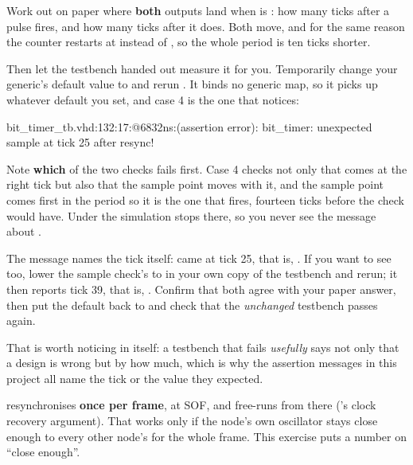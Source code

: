  Work out on paper where \textbf{both} outputs land when  is :
how many ticks after a  pulse  fires, and how many ticks after it
 does. Both move, and for the same reason \textemdash{} the counter restarts at
 instead of , so the whole period is ten ticks shorter.

Then let the testbench handed out measure it for you. Temporarily change your generic's default value
to  and rerun . It binds no generic map, so it picks up whatever default
you set, and case 4 is the one that notices:

\begin{console}
bit_timer_tb.vhd:132:17:@6832ns:(assertion error): bit_timer: unexpected sample at tick 25 after resync!
\end{console}

Note \textbf{which} of the two checks fails first. Case 4 checks not only that  comes
at the right tick but also that the sample point moves with it, and the sample point comes first in
the period \textemdash{} so it is the one that fires, fourteen ticks before the  check
would have. Under  the simulation stops there, so you never see the
message about .

The message names the tick itself:  came at tick 25, that is,
. If you want to see  too, lower the sample check's
 to  in your own copy of the testbench and rerun; it then
reports tick 39, that is, . Confirm that both agree with your
paper answer, then put the default back to  and check that the \emph{unchanged} testbench
passes again.

That is worth noticing in itself: a testbench that fails \emph{usefully} says not only that a design
is wrong but by how much, which is why the assertion messages in this project all name the tick or
the value they expected.

\label{c12:ex:drift}
 resynchronises \textbf{once per frame}, at SOF, and free-runs from there
('s clock recovery argument). That works only if the node's own oscillator
stays close enough to every other node's for the whole frame. This exercise puts a number on ``close
enough''.

